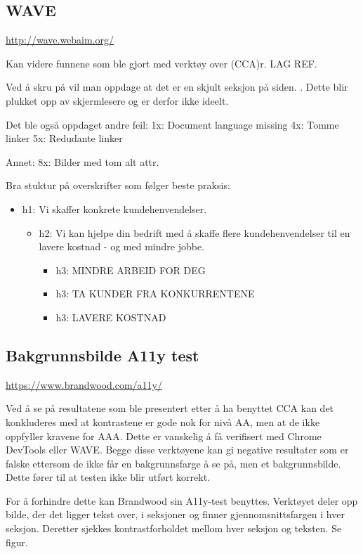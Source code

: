 \subsection{WAVE}
\url{http://wave.webaim.org/}

Kan videre  funnene som ble gjort med verktøy over (CCA)r. LAG REF.

Ved å skru på  vil man oppdage at det er en skjult seksjon på siden.
. Dette blir plukket opp av skjermlesere og er derfor ikke ideelt.

Det ble også oppdaget andre feil:
1x: Document language missing
4x: Tomme linker
5x: Redudante linker

Annet:
8x: Bilder med tom alt attr.

Bra stuktur på overskrifter som følger beste praksis:
\begin{itemize}
    \item h1: Vi skaffer konkrete kundehenvendelser.
    \begin{itemize}
        \item h2: Vi kan hjelpe din bedrift med å skaffe flere kundehenvendelser til en lavere kostnad - og med mindre jobbe.
        \begin{itemize}
            \item h3: MINDRE ARBEID FOR DEG
            \item h3: TA KUNDER FRA KONKURRENTENE
            \item h3: LAVERE KOSTNAD
        \end{itemize}
    \end{itemize}
\end{itemize}

\subsection{Bakgrunnsbilde A11y test}
\url{https://www.brandwood.com/a11y/}

Ved å se på resultatene som ble presentert etter å ha benyttet CCA kan det konkluderes med at kontrastene er gode nok for nivå AA, men at de ikke oppfyller kravene for AAA. Dette er vanskelig å få verifisert med Chrome DevTools eller WAVE. Begge disse verktøyene kan gi negative resultater som er falske ettersom de ikke får en bakgrunnsfarge å se på, men et bakgrunnsbilde. Dette fører til at testen ikke blir utført korrekt.

For å forhindre dette kan Brandwood sin A11y-test benyttes. Verktøyet deler opp bilde, der det ligger tekst over, i seksjoner og finner gjennomsnittsfargen i hver seksjon. Deretter sjekkes kontrastforholdet mellom hver seksjon og teksten.
Se figur.

